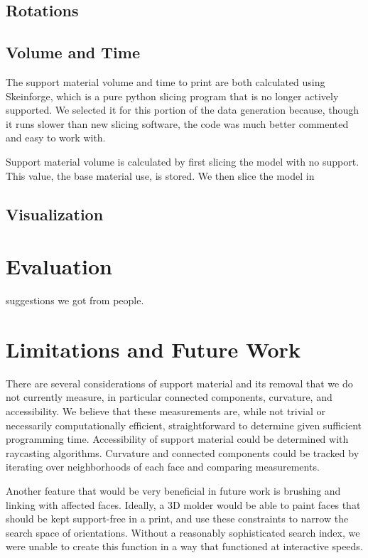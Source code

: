 \documentclass{sigchi}
\begin{document}
\subsection{Rotations}

\subsection{Volume and Time}
The support material volume and time to print are both calculated using Skeinforge, which is a pure python slicing program that is no longer actively supported.  We selected it for this portion of the data generation because, though it runs slower than new slicing software, the code was much better commented and easy to work with.

Support material volume is calculated by first slicing the model with no support.  This value, the base material use, is stored.  We then slice the model in 


\subsection{Visualization}

\section{Evaluation}
suggestions we got from people.

\section{Limitations and Future Work}
There are several considerations of support material and its removal that we do not currently measure, in particular connected components, curvature, and accessibility.  We believe that these measurements are, while not trivial or necessarily computationally efficient, straightforward to determine given sufficient programming time.  Accessibility of support material could be determined with raycasting algorithms.  Curvature and connected components could be tracked by iterating over neighborhoods of each face and comparing measurements.

Another feature that would be very beneficial in future work is brushing and linking with affected faces.  Ideally, a 3D molder would be able to paint faces that should be kept support-free in a print, and use these constraints to narrow the search space of orientations.  Without a reasonably sophisticated search index, we were unable to create this function in a way that functioned at interactive speeds.
\end{document}
